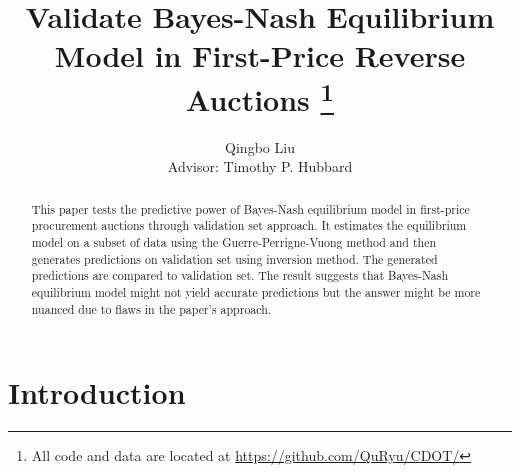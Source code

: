 \documentclass[11pt]{article}
\title{%
    Validate Bayes-Nash Equilibrium Model 
    in First-Price Reverse Auctions 
    \footnote{ All code and data are located at
    \url{https://github.com/QuRyu/CDOT/} }}
\author{Qingbo Liu\\[0.5cm]{\small Advisor: Timothy P. Hubbard}}
\date{\vspace{-5ex}}
\begin{document}
\maketitle

\begin{abstract}
    This paper tests the predictive power of Bayes-Nash equilibrium model in 
    first-price procurement auctions through validation set approach. It 
    estimates the equilibrium model on a subset of data using the 
    Guerre-Perrigne-Vuong method 
    and then generates predictions on validation set using inversion method. 
    The generated predictions are compared to validation set.
    The result suggests that Bayes-Nash equilibrium model might not 
    yield accurate predictions but the answer might be more nuanced due to 
    flaws in the paper's approach. 
\end{abstract}

\section{Introduction}

\end{document}
